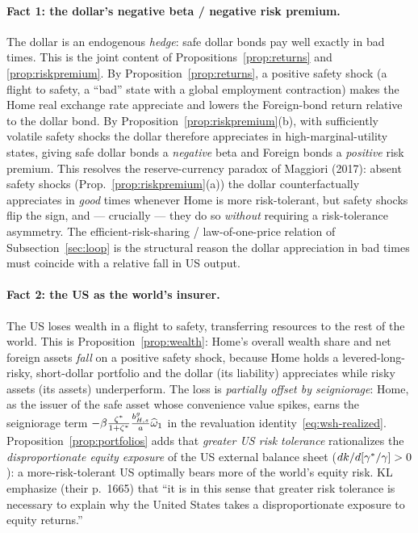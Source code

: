 \paragraph{Fact 1: the dollar's negative beta / negative risk premium.} The dollar
is an endogenous \emph{hedge}: safe dollar bonds pay well exactly in bad times.
This is the joint content of Propositions~\ref{prop:returns} and
\ref{prop:riskpremium}. By Proposition~\ref{prop:returns}, a positive safety shock
(a flight to safety, a ``bad'' state with a global employment contraction) makes
the Home real exchange rate appreciate and lowers the Foreign-bond return relative
to the dollar bond. By Proposition~\ref{prop:riskpremium}(b), with sufficiently
volatile safety shocks the dollar therefore appreciates in high-marginal-utility
states, giving safe dollar bonds a \emph{negative} beta and Foreign bonds a
\emph{positive} risk premium. This resolves the reserve-currency paradox of
Maggiori (2017): absent safety shocks (Prop.~\ref{prop:riskpremium}(a)) the dollar
counterfactually appreciates in \emph{good} times whenever Home is more
risk-tolerant, but safety shocks flip the sign, and --- crucially --- they do so
\emph{without} requiring a risk-tolerance asymmetry. The efficient-risk-sharing /
law-of-one-price relation of Subsection~\ref{sec:loop} is the structural reason the
dollar appreciation in bad times must coincide with a relative fall in US output.

\paragraph{Fact 2: the US as the world's insurer.} The US loses wealth in a flight
to safety, transferring resources to the rest of the world. This is
Proposition~\ref{prop:wealth}: Home's overall wealth share and net foreign assets
\emph{fall} on a positive safety shock, because Home holds a levered-long-risky,
short-dollar portfolio and the dollar (its liability) appreciates while risky
assets (its assets) underperform. The loss is \emph{partially offset by
seigniorage}: Home, as the issuer of the safe asset whose convenience value
spikes, earns the seigniorage term $-\beta\frac{\zeta^{*}}{1+\zeta^{*}}\frac{b^g_{H,s}}{a}\widehat{\omega}_1$
in the revaluation identity~\eqref{eq:wsh-realized}. Proposition~\ref{prop:portfolios}
adds that \emph{greater US risk tolerance} rationalizes the \emph{disproportionate
equity exposure} of the US external balance sheet ($dk/d[\gamma^{*}/\gamma]>0$): a
more-risk-tolerant US optimally bears more of the world's equity risk. KL
emphasize (their p.~1665) that ``it is in this sense that greater risk tolerance is
necessary to explain why the United States takes a disproportionate exposure to
equity returns.''

